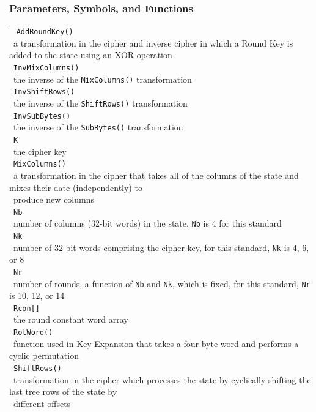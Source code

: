 \documentclass[10pt,letterpaper]{scrartcl}
\newcommand{\tbul}{\textbullet}
\newcommand{\tend}{\>\textendash}
\newcommand{\tabDef}{\hspace{2em}\=\hspace{2em}\=\hspace{2em}\=\hspace{2em}\=\kill}
\begin{document}
	\subsubsection*{Parameters, Symbols, and Functions}\begin{tabbing}\tabDef 
	\tbul\ \texttt{AddRoundKey()}\\
	\tend\ a transformation in the cipher and inverse cipher in which a Round Key is added to the state using an XOR operation \\
	\tbul\ \texttt{InvMixColumns()} \\
	\tend\ the inverse of the \texttt{MixColumns()} transformation \\
	\tbul\ \texttt{InvShiftRows()} \\
	\tend\ the inverse of the \texttt{ShiftRows()} transformation \\
	\tbul\ \texttt{InvSubBytes()} \\
	\tend\ the inverse of the \texttt{SubBytes()} transformation \\
	\tbul\ \texttt{K} \\
	\tend\ the cipher key \\
	\tbul\ \texttt{MixColumns()} \\
	\tend\ a transformation in the cipher that takes all of the columns of the state and mixes their date (independently) to\\ \>\ produce new columns \\
	\tbul\ \texttt{Nb} \\
	\tend\ number of columns (32-bit words) in the state, \texttt{Nb} is 4 for this standard \\
	\tbul\ \texttt{Nk} \\
	\tend\ number of 32-bit words comprising the cipher key, for this standard, \texttt{Nk} is 4, 6, or 8 \\
	\tbul\ \texttt{Nr} \\
	\tend\ number of rounds, a function of \texttt{Nb} and \texttt{Nk}, which is fixed, for this standard, \texttt{Nr} is 10, 12, or 14 \\
	\tbul\ \texttt{Rcon[]} \\
	\tend\ the round constant word array \\
	\tbul\ \texttt{RotWord()} \\
	\tend\ function used in Key Expansion that takes a four byte word and performs a cyclic permutation \\
	\tbul\ \texttt{ShiftRows()} \\
	\tend\ transformation in the cipher which processes the state by cyclically shifting the last tree rows of the state by\\ \>\ different offsets \\

\end{tabbing}
\end{document}
